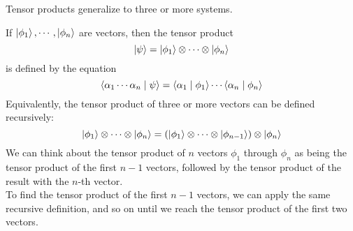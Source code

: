 
Tensor products generalize to three or more systems.

\bigbreak

If $\ket{\phi_1},\cdots,\ket{\phi_n}$ are vectors, then the tensor product
\begin{equation*}
    \ket{\psi}=\ket{\phi_1}\otimes\cdots\otimes\ket{\phi_n}
\end{equation*}
is defined by the equation 
\begin{equation*}
    \braket{\alpha_1\cdots\alpha_n\mid\psi}=\braket{\alpha_1\mid\phi_1}\cdots\braket{\alpha_n\mid\phi_n}
\end{equation*}
Equivalently, the tensor product of three or more vectors can be defined recursively:
\begin{equation*}
    \ket{\phi_1}\otimes\cdots\otimes\ket{\phi_n}=(\ket{\phi_1}\otimes\cdots\otimes\ket{\phi_{n-1}})\otimes\ket{\phi_n}
\end{equation*}
We can think about the tensor product of $n$ vectors $\phi_1$ through $\phi_n$ as being the tensor product of the first $n-1$ vectors, followed by the tensor product of the result with the $n$-th vector.\\[1em]
To find the tensor product of the first $n-1$ vectors, we can apply the same recursive definition, and so on until we reach the tensor product of the first two vectors.

